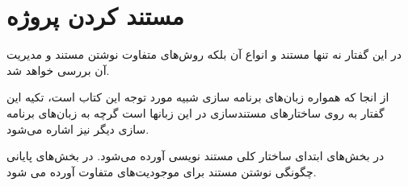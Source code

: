 %
% 
% 
% 
%
\chapter{مستند کردن پروژه}

در این گفتار نه تنها مستند و انواع آن بلکه روش‌های متفاوت نوشتن مستند و مدیریت
آن بررسی خواهد شد.

از انجا که همواره زبان‌های برنامه سازی شبیه  مورد توجه این کتاب است،
تکیه این گفتار به روی ساختارهای مستندسازی در این زبانها است گرچه به زبان‌های
برنامه سازی دیگر نیز اشاره می‌شود.

 در بخش‌های ابتدای ساختار کلی مستند نویسی آورده می‌شود. در بخش‌های پایانی
چگونگی نوشتن مستند برای موجودیت‌های متفاوت آورده می شود.





% 
% 


% 
% 
% 